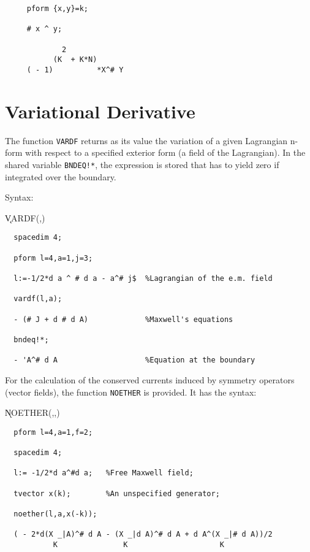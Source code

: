 \begin{verbatim}
     pform {x,y}=k;

     # x ^ y;

             2
           (K  + K*N)
     ( - 1)          *X^# Y
\end{verbatim}

\section{Variational Derivative}

The function {\tt VARDF}\label{VARDF} returns as its value the
variation of a given Lagrangian n-form with respect to a specified
exterior form (a field of the Lagrangian).  In the shared variable
{\tt BNDEQ!*}, the expression is stored that has to yield zero if
integrated over the boundary.

Syntax:

\hspace*{2em} \k{VARDF}(,)

\example{}

\begin{verbatim}
  spacedim 4;

  pform l=4,a=1,j=3;

  l:=-1/2*d a ^ # d a - a^# j$  %Lagrangian of the e.m. field

  vardf(l,a);

  - (# J + d # d A)             %Maxwell's equations

  bndeq!*;

  - 'A^# d A                    %Equation at the boundary
\end{verbatim}
For the calculation of the conserved currents induced by symmetry
operators (vector fields), the function {\tt NOETHER}\label{NOETHER}
is provided.  It has the syntax:

\hspace*{2em}
\k{NOETHER}(,,)

\example{}

\begin{verbatim}
  pform l=4,a=1,f=2;

  spacedim 4;

  l:= -1/2*d a^#d a;   %Free Maxwell field;

  tvector x(k);        %An unspecified generator;

  noether(l,a,x(-k));

  ( - 2*d(X _|A)^# d A - (X _|d A)^# d A + d A^(X _|# d A))/2
           K               K                     K
\end{verbatim}



